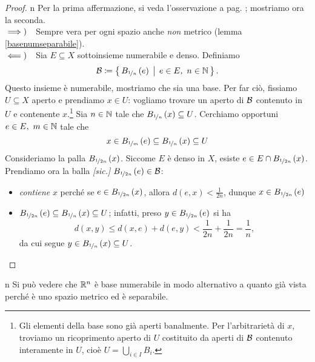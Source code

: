 \begin{proof}{n}
Per la prima affermazione, si veda l'osservazione a pag. \pageref{metrico implica primo num}; mostriamo ora la seconda.\\
$\implies)\quad$Sempre vera per ogni spazio anche \textit{non} metrico (lemma \ref{basenumseparabile}).\\
$\impliedby)\quad$Sia $E\subseteq X$ sottoinsieme numerabile e denso. Definiamo
\begin{equation*}
	\basis\coloneqq\Set{B_{\nicefrac{1}{n}}\left(e\right)| e\in E,\ n\in \N}.
\end{equation*}
Questo insieme è numerabile, mostriamo che sia una base. Per far ciò, fissiamo $U\subseteq X$ aperto e prendiamo $x\in U$: vogliamo trovare un aperto di $\mathcal{B}$ contenuto in $U$ e contenente $x$.\footnote{Gli elementi della base sono già aperti banalmente. Per l'arbitrarietà di $x$, troviamo un ricoprimento aperto di $U$ costituito da aperti di $\mathcal{B}$ contenuto interamente in $U$, cioè $U=\bigcup_{i\in I}B_i$.} Sia $n\in\mathbb{N}$ tale che $B_{\nicefrac{1}{n}}\left(x\right)\subseteq U$. Cerchiamo opportuni $e\in E,\ m\in\N$ tale che
\begin{equation*}
x\in B_{\nicefrac{1}{m}}\left(e\right)\subseteq B_{\nicefrac{1}{n}}\left(x\right)\subseteq U
\end{equation*}
Consideriamo la palla $B_{\nicefrac{1}{2n}}\left(x\right)$. Siccome $E$ è denso in $X$, esiste $e\in E\cap B_{\nicefrac{1}{2n}}\left(x\right)$. Prendiamo ora la balla \textit{[sic.]} $B_{\nicefrac{1}{2n}}\left(e\right)\in\mathcal{B}$:
\begin{itemize}
	\item \textit{contiene} $x$ perché se $e\in B_{\nicefrac{1}{2n}}\left(x\right)$, allora $d\left(e,x\right)<\frac{1}{2n}$, dunque $x\in B_{\nicefrac{1}{2n}}\left(e\right)$
	\item $B_{\nicefrac{1}{2n}}\left(e\right)\subseteq B_{\nicefrac{1}{n}}\left(x\right)\subseteq U$; infatti, preso $y\in B_{\nicefrac{1}{2n}}\left(e\right)$ si ha
	\begin{equation*}
		d\left(x,y\right)\leq d\left(x,e\right)+d\left(e,y\right)<\frac{1}{2n}+\frac{1}{2n}=\frac{1}{n},
	\end{equation*}
da cui segue $y\in B_{\nicefrac{1}{n}}\left(x\right) \subseteq U$.\qedhere
\end{itemize}
\end{proof}
\begin{example}{n}
	Si può vedere che $\mathbb{R}^n$ è base numerabile in modo alternativo a quanto già vista perché è uno spazio metrico ed è separabile.
\end{example}
